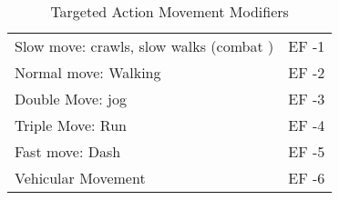 \begin{table}[htb]
\centering
\caption{Targeted Action Movement Modifiers}
	\begin{tabular}{||l|l||} \hline
	Slow move: crawls, slow walks (combat )   & EF -1 \\
	Normal move: Walking                      & EF -2 \\
	Double Move: jog                          & EF -3 \\
	Triple Move: Run                          & EF -4 \\
	Fast move: Dash                           & EF -5 \\
	Vehicular Movement                        & EF -6 \\  \hline
	\end{tabular}
\end{table}
